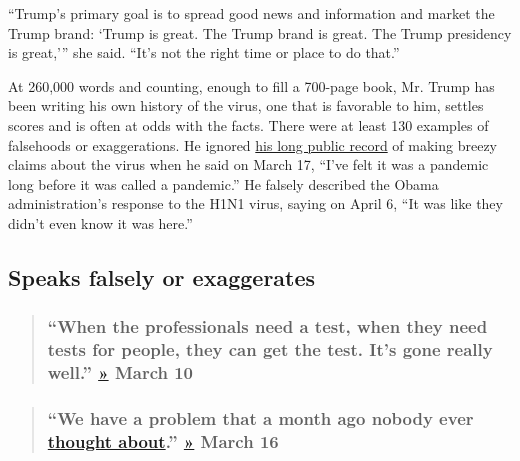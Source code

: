 ``Trump's primary goal is to spread good news and information and market
the Trump brand: `Trump is great. The Trump brand is great. The Trump
presidency is great,''' she said. ``It's not the right time or place to
do that.''

At 260,000 words and counting, enough to fill a 700-page book, Mr. Trump
has been writing his own history of the virus, one that is favorable to
him, settles scores and is often at odds with the facts. There were at
least 130 examples of falsehoods or exaggerations. He ignored
\href{https://www.nytimes.com/2020/03/27/us/politics/trump-coronavirus-factcheck.html}{his
long public record} of making breezy claims about the virus when he said
on March 17, ``I've felt it was a pandemic long before it was called a
pandemic.'' He falsely described the Obama administration's response to
the H1N1 virus, saying on April 6, ``It was like they didn't even know
it was here.''

\hypertarget{speaks-falsely-or-exaggerates}{%
\subsection{Speaks falsely or
exaggerates}\label{speaks-falsely-or-exaggerates}}

\begin{quote}
\hypertarget{when-the-professionals-need-a-test-when-they-need-tests-for-people-they-can-get-the-test-its-gone-really-well--march-10}{%
\subsubsection{\texorpdfstring{``When the professionals need a test,
when they need tests for people, they can get the test. It's gone really
well.''
\href{https://www.whitehouse.gov/briefings-statements/remarks-president-trump-meeting-republican-senators-2/}{»}
\textbf{March
10}}{``When the professionals need a test, when they need tests for people, they can get the test. It's gone really well.'' » March 10}}\label{when-the-professionals-need-a-test-when-they-need-tests-for-people-they-can-get-the-test-its-gone-really-well--march-10}}
\end{quote}

\begin{quote}
\hypertarget{we-have-a-problem-that-a-month-ago-nobody-ever-thought-about--march-16}{%
\subsubsection{\texorpdfstring{``We have a problem that a month ago
nobody ever
\href{https://www.nytimes.com/2020/04/11/us/politics/coronavirus-trump-response.html}{thought
about}.''
\href{https://www.whitehouse.gov/briefings-statements/remarks-president-trump-vice-president-pence-members-coronavirus-task-force-press-briefing-3/}{»}
\textbf{March
16}}{``We have a problem that a month ago nobody ever thought about.'' » March 16}}\label{we-have-a-problem-that-a-month-ago-nobody-ever-thought-about--march-16}}
\end{quote}

